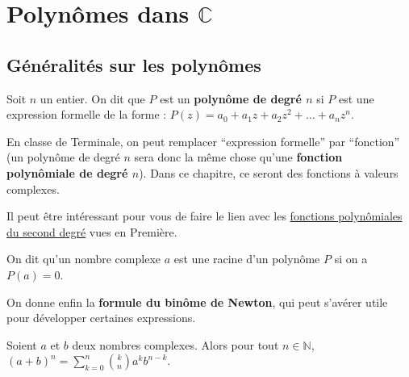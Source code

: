 	\section{Polynômes dans \texorpdfstring{$\mathbb{C}$}{C}}
	
	\subsection{Généralités sur les polynômes}
	
	\begin{formula}[Définition]
		Soit $n$ un entier. On dit que $P$ est un \textbf{polynôme de degré $n$} si $P$ est une expression formelle de la forme : $P(z) = a_0 + a_1 z + a_2 z^2 + \dots + a_n z^n$.
	\end{formula}
	
	En classe de Terminale, on peut remplacer ``expression formelle'' par ``fonction'' (un polynôme de degré $n$ sera donc la même chose qu'une \textbf{fonction polynômiale de degré $n$}). Dans ce chapitre, ce seront des fonctions à valeurs complexes.
	
	\begin{tip}
		Il peut être intéressant pour vous de faire le lien avec les \href{https://bacomathiqu.es/cours/premiere/polynomes-second-degre/}{fonctions polynômiales du second degré} vues en Première.
	\end{tip}
	
	\begin{formula}
		On dit qu'un nombre complexe $a$ est une racine d'un polynôme $P$ si on a $P(a) = 0$.
	\end{formula}
	
	On donne enfin la \textbf{formule du binôme de Newton}, qui peut s'avérer utile pour développer certaines expressions.
	
	\begin{formula}
		Soient $a$ et $b$ deux nombres complexes.
		\newpar
		Alors pour tout $n \in \mathbb{N}$, $\displaystyle{(a + b)^n = \sum_{k = 0}^n \binom{k}{n} a^k b^{n-k}}$.
	\end{formula}
	
